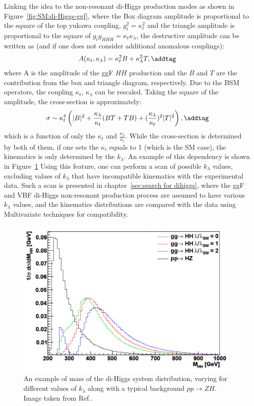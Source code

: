 Linking the idea to the non-resonant di-Higgs production modes as shown in Figure~\ref{fig:SM:di-Higgs-ggf},
where the Box diagram amplitude is proportional to the square of the top
yukawa coupling, $g_t^2 = \kappa_t^2$ and the triangle amplitude is 
proportional to the square of $g_t g_{HHH} = \kappa_t \kappa_\lambda$,
the destructive amplitude can be written as 
(and if one does not consider additional anomalous couplings):
\[
A(\kappa_t, \kappa_\lambda)  = \kappa_t^2 B +  \kappa_\lambda^2  T,
\addtag \]
where A is the amplitude of the ggF $HH$ production and the 
$B$ and $T$ are the contribution from the box and triangle diagram, respectively. 
Due to the BSM operators, the coupling $\kappa_t$, $\kappa_\lambda$ can be rescaled.
Taking the square of the amplitude, the cross-section is approximately:
\[
\sigma \sim \kappa_t^4 \left(  |B|^2 + \frac{\kappa_\lambda}{\kappa_t} (BT +TB) + (\frac{\kappa_\lambda}{\kappa_t})^2 |T|^2  \right),    
\addtag \]
which is a function of only the $\kappa_t$ and $\frac{\kappa_\lambda}{\kappa_t}$.
While the cross-section is determined by both of them, if one sets the 
$\kappa_t$ equals to 1 (which is the SM case), the kinematics is only 
determined by the $k_\lambda$.
An example of this dependency is shown in Figure~\ref{fig:BSM:kl_mhh}
Using this feature, one can perform a scan of possible $k_\lambda$ values,
excluding values of $k_\lambda$ that have incompatible kinematics with the 
experimental data. 
Such a scan is presented in chapter~\ref{sec:search for dihiggs},
where the ggF and VBF di-Higgs non-resonant production process are assumed to have 
various $k_\lambda$ values, and the kinematics distributions are compared
with the data using Multivariate techniques for compatibility.

\begin{figure}[htbp]
\centering
\includegraphics[width=.41\textwidth]{theory/plots/kl_mhh.png}
\caption{An example of mass of the di-Higgs system distribution, 
varying for different values of $k_\lambda$ along with a typical
background $pp \rightarrow ZH$. Image taken from Ref.\cite{kl_mhh}.
}
\label{fig:BSM:kl_mhh}
\end{figure}